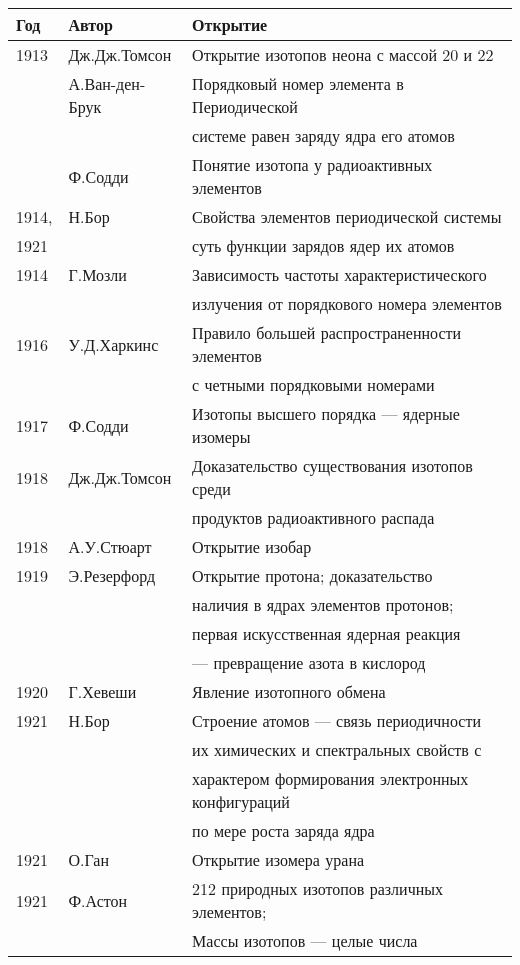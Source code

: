 \documentclass[a5paper,openany]{book}
\begin{document}
		{\small	
				\begin{tabular}{l|l|l}
					Год & Автор	& Открытие \\
					\hline
					1913 & Дж.Дж.Томсон & Открытие {\color{red}изотопов} неона с массой 20 и 22\\
					~ & А.Ван-ден-Брук & {\color{red}Порядковый номер элемента в Периодической}  \\
					~ & ~ &  {\color{red}системе равен заряду ядра его 	атомов} \\
					~ & Ф.Содди & Понятие изотопа у радиоактивных
					элементов   \\
					1914, & Н.Бор & Свойства элементов периодической системы  \\
					1921 & ~ & суть  функции зарядов ядер их атомов \\
					1914 & Г.Мозли & Зависимость  частоты характеристического	  \\
					~ & ~ & излучения от порядкового номера элементов \\
					1916 & У.Д.Харкинс & {\color{red}Правило большей распространенности элементов}\\
					~ & ~ & {\color{red}с четными порядковыми номерами} \\
					1917 & Ф.Содди  & Изотопы высшего порядка --- ядерные изомеры\\
					1918 & Дж.Дж.Томсон  &  Доказательство существования изотопов среди\\
					~ & ~ & продуктов радиоактивного распада \\
					1918 & А.У.Стюарт  &  Открытие {\color{red}изобар}\\
					1919 &Э.Резерфорд &   Открытие протона; доказательство  \\
					~ & ~ & наличия в ядрах элементов протонов; \\
					~ & ~ & первая искусственная ядерная реакция \\
					~ & ~ & --- превращение азота в кислород \\
					1920 & Г.Хевеши & Явление изотопного обмена\\
					1921 & Н.Бор & Строение атомов --- связь периодичности  \\
					~ & ~ & их химических и спектральных свойств с \\
					~ & ~ &  характером формирования электронных конфигураций \\
					~ & ~ &  по мере роста заряда ядра \\
					1921 & О.Ган  & Открытие изомера урана\\
					1921 & Ф.Астон  & {\color{red}212 природных изотопов различных элементов;} \\
					~ & ~ &   {\color{red}Массы изотопов --- целые числа} \\
					\hline
				\end{tabular}
			}	
			
\end{document}
